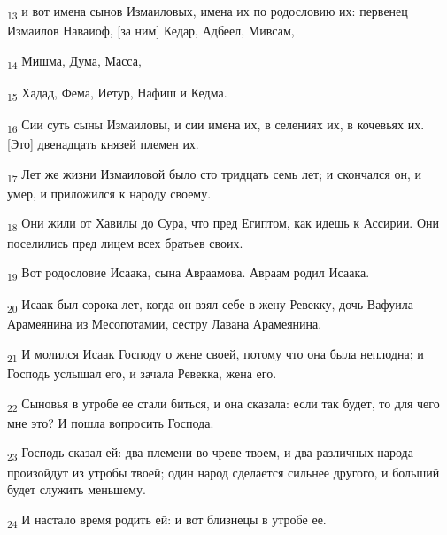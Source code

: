 \begin{tcolorbox}
\textsubscript{13} и вот имена сынов Измаиловых, имена их по родословию их: первенец Измаилов Наваиоф, [за ним] Кедар, Адбеел, Мивсам,
\end{tcolorbox}
\begin{tcolorbox}
\textsubscript{14} Мишма, Дума, Масса,
\end{tcolorbox}
\begin{tcolorbox}
\textsubscript{15} Хадад, Фема, Иетур, Нафиш и Кедма.
\end{tcolorbox}
\begin{tcolorbox}
\textsubscript{16} Сии суть сыны Измаиловы, и сии имена их, в селениях их, в кочевьях их. [Это] двенадцать князей племен их.
\end{tcolorbox}
\begin{tcolorbox}
\textsubscript{17} Лет же жизни Измаиловой было сто тридцать семь лет; и скончался он, и умер, и приложился к народу своему.
\end{tcolorbox}
\begin{tcolorbox}
\textsubscript{18} Они жили от Хавилы до Сура, что пред Египтом, как идешь к Ассирии. Они поселились пред лицем всех братьев своих.
\end{tcolorbox}
\begin{tcolorbox}
\textsubscript{19} Вот родословие Исаака, сына Авраамова. Авраам родил Исаака.
\end{tcolorbox}
\begin{tcolorbox}
\textsubscript{20} Исаак был сорока лет, когда он взял себе в жену Ревекку, дочь Вафуила Арамеянина из Месопотамии, сестру Лавана Арамеянина.
\end{tcolorbox}
\begin{tcolorbox}
\textsubscript{21} И молился Исаак Господу о жене своей, потому что она была неплодна; и Господь услышал его, и зачала Ревекка, жена его.
\end{tcolorbox}
\begin{tcolorbox}
\textsubscript{22} Сыновья в утробе ее стали биться, и она сказала: если так будет, то для чего мне это? И пошла вопросить Господа.
\end{tcolorbox}
\begin{tcolorbox}
\textsubscript{23} Господь сказал ей: два племени во чреве твоем, и два различных народа произойдут из утробы твоей; один народ сделается сильнее другого, и больший будет служить меньшему.
\end{tcolorbox}
\begin{tcolorbox}
\textsubscript{24} И настало время родить ей: и вот близнецы в утробе ее.
\end{tcolorbox}
